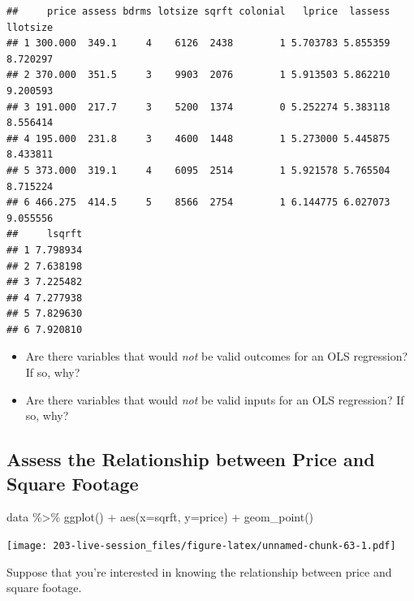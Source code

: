 \documentclass[
]{book}
\newenvironment{Shaded}{\begin{snugshade}}{\end{snugshade}}
\newcommand{\AttributeTok}[1]{\textcolor[rgb]{0.77,0.63,0.00}{#1}}
\newcommand{\FunctionTok}[1]{\textcolor[rgb]{0.00,0.00,0.00}{#1}}
\newcommand{\NormalTok}[1]{#1}
\newcommand{\SpecialCharTok}[1]{\textcolor[rgb]{0.00,0.00,0.00}{#1}}
\providecommand{\tightlist}{%
  \setlength{\itemsep}{0pt}\setlength{\parskip}{0pt}}
\theoremstyle{definition}
\theoremstyle{definition}
\theoremstyle{definition}
\theoremstyle{definition}
\theoremstyle{remark}
\begin{document}
\begin{verbatim}
##     price assess bdrms lotsize sqrft colonial   lprice  lassess llotsize
## 1 300.000  349.1     4    6126  2438        1 5.703783 5.855359 8.720297
## 2 370.000  351.5     3    9903  2076        1 5.913503 5.862210 9.200593
## 3 191.000  217.7     3    5200  1374        0 5.252274 5.383118 8.556414
## 4 195.000  231.8     3    4600  1448        1 5.273000 5.445875 8.433811
## 5 373.000  319.1     4    6095  2514        1 5.921578 5.765504 8.715224
## 6 466.275  414.5     5    8566  2754        1 6.144775 6.027073 9.055556
##     lsqrft
## 1 7.798934
## 2 7.638198
## 3 7.225482
## 4 7.277938
## 5 7.829630
## 6 7.920810
\end{verbatim}

\begin{itemize}
\tightlist
\item
  Are there variables that would \emph{not} be valid outcomes for an OLS regression? If so, why?
\item
  Are there variables that would \emph{not} be valid inputs for an OLS regression? If so, why?
\end{itemize}

\hypertarget{assess-the-relationship-between-price-and-square-footage}{%
\subsection{Assess the Relationship between Price and Square Footage}\label{assess-the-relationship-between-price-and-square-footage}}

\begin{Shaded}
\begin{Highlighting}[]
\NormalTok{data }\SpecialCharTok{\%\textgreater{}\%} 
  \FunctionTok{ggplot}\NormalTok{() }\SpecialCharTok{+} 
  \FunctionTok{aes}\NormalTok{(}\AttributeTok{x=}\NormalTok{sqrft, }\AttributeTok{y=}\NormalTok{price) }\SpecialCharTok{+} 
  \FunctionTok{geom\_point}\NormalTok{()}
\end{Highlighting}
\end{Shaded}

\texttt{[image: 203-live-session\_files/figure-latex/unnamed-chunk-63-1.pdf]}

Suppose that you're interested in knowing the relationship between price and square footage.
\end{document}
